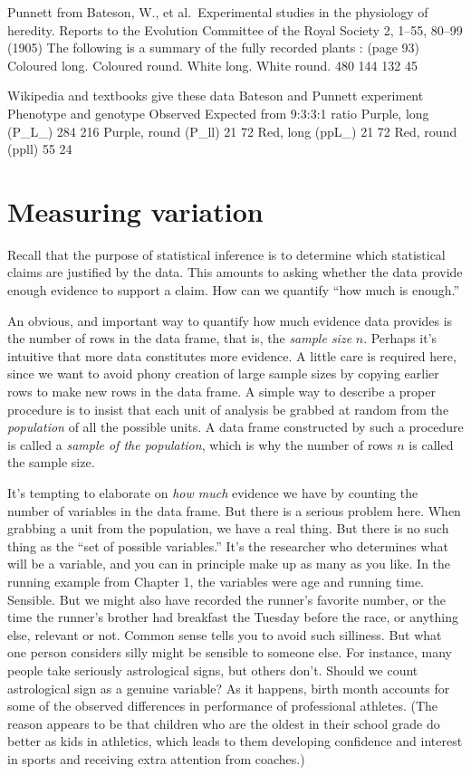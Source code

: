 \documentclass[]{tufte-book}
\begin{document}
Punnett from Bateson, W., et al.~Experimental studies in the physiology of heredity. Reports to the Evolution Committee of the Royal Society 2, 1--55, 80--99 (1905)
The following is a summary of the fully recorded plants : (page 93)
Coloured long. Coloured round. White long. White round. 480 144 132 45

Wikipedia and textbooks give these data
Bateson and Punnett experiment
Phenotype and genotype Observed Expected from 9:3:3:1 ratio
Purple, long (P\_L\_) 284 216
Purple, round (P\_ll) 21 72
Red, long (ppL\_) 21 72
Red, round (ppll) 55 24

\hypertarget{measuring-variation}{%
\chapter{Measuring variation}\label{measuring-variation}}

Recall that the purpose of statistical inference is to determine which statistical claims are justified by the data. This amounts to asking whether the data provide enough evidence to support a claim. How can we quantify ``how much is enough.''

An obvious, and important way to quantify how much evidence data provides is the number of rows in the data frame, that is, the \emph{sample size} \(n\). Perhaps it's intuitive that more data constitutes more evidence. A little care is required here, since we want to avoid phony creation of large sample sizes by copying earlier rows to make new rows in the data frame. A simple way to describe a proper procedure is to insist that each unit of analysis be grabbed at random from the \emph{population} of all the possible units. A data frame constructed by such a procedure is called a \emph{sample of the population}, which is why the number of rows \(n\) is called the sample size.

It's tempting to elaborate on \emph{how much} evidence we have by counting the number of variables in the data frame. But there is a serious problem here. When grabbing a unit from the population, we have a real thing. But there is no such thing as the ``set of possible variables.'' It's the researcher who determines what will be a variable, and you can in principle make up as many as you like. In the running example from Chapter 1, the variables were age and running time. Sensible. But we might also have recorded the runner's favorite number, or the time the runner's brother had breakfast the Tuesday before the race, or anything else, relevant or not. Common sense tells you to avoid such silliness. But what one person considers silly might be sensible to someone else. For instance, many people take seriously astrological signs, but others don't. Should we count astrological sign as a genuine variable? As it happens, birth month accounts for some of the observed differences in performance of professional athletes. (The reason appears to be that children who are the oldest in their school grade do better as kids in athletics, which leads to them developing confidence and interest in sports and receiving extra attention from coaches.)
\end{document}
